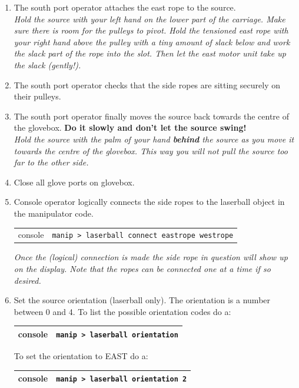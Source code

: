 \documentclass[11pt]{article}
\begin{document}
\begin{enumerate}
\item \CheckBox[name=aesr14]{} The south port operator attaches the east rope to the source. \\ {\it Hold the source with your left hand on the lower part of the carriage. Make sure there is room for the pulleys to pivot. Hold the tensioned east rope with your right hand above the pulley with a tiny amount of slack below and work the slack part of the rope into the slot. Then let the east motor unit take up the slack (gently!).}
\item \CheckBox[name=aesr15]{} The south port operator checks that the side ropes are sitting securely on their pulleys. 
\item \CheckBox[name=aesr16]{} The south port operator finally moves the source back towards the centre of the glovebox. {\bf Do it slowly and don't let the source swing!} \\ {\it Hold the source with the palm of your hand {\bf behind} the source as you move it towards the centre of the glovebox. This way you will not pull the source too far to the other side.}
\item \CheckBox[name=aesr17]{} Close all glove ports on glovebox.
\item \CheckBox[name=aesr18]{} Console operator logically connects the side ropes to the laserball object in the manipulator code.
\begin{center}
\begin{tabular}{|c|c|}
console & \verb+manip > laserball connect eastrope westrope+ \\
\end{tabular}
\end{center}
{\it Once the (logical) connection is made the side rope in question will show up on the display. Note that the ropes can be connected one at a time if so desired.}
\item \CheckBox[name=aesr19]{} Set the source orientation (laserball only). The orientation is a number between 0 and 4. To list the possible orientation codes do a:
\begin{center}
\begin{tabular}{|c|c|}
\hline
console & \verb+manip > laserball orientation+ \\
\hline
\end{tabular}
\end{center}
To set the orientation to EAST do a:
\begin{center}
\begin{tabular}{|c|c|}
\hline
console & \verb+manip > laserball orientation 2+ \\
\hline
\end{tabular}
\end{center}
\end{enumerate}
\end{document}
